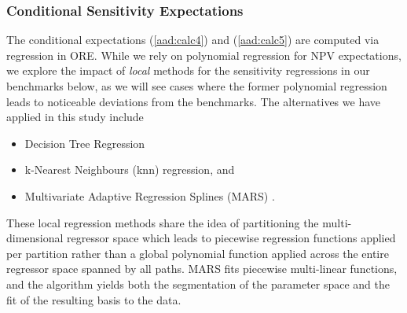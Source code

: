 \documentclass[11pt,a4paper,oneside]{article}
\begin{document}


\subsubsection{Conditional Sensitivity Expectations}\label{sec:sensi_regression}

The conditional expectations (\ref{aad:calc4}) and (\ref{aad:calc5}) are computed via regression in ORE.
While we rely on polynomial regression for NPV expectations, we explore the impact of {\em local} methods
for the sensitivity regressions in our benchmarks below, as we will see cases where the former polynomial regression
leads to noticeable deviations from the benchmarks. 
The alternatives we have applied in this study include
\begin{itemize}
\item Decision Tree Regression
\item k-Nearest Neighbours (knn) regression, and
\item Multivariate Adaptive Regression Splines (MARS) \cite{MARS}.
\end{itemize}
These local regression methods share the idea of partitioning the multi-dimensional regressor space which leads to piecewise
regression functions applied per partition rather than a global polynomial function applied across the entire regressor
space spanned by all paths. MARS fits piecewise multi-linear functions, and the algorithm yields both the segmentation of the
parameter space and the fit of the resulting basis to the data.
\end{document}
